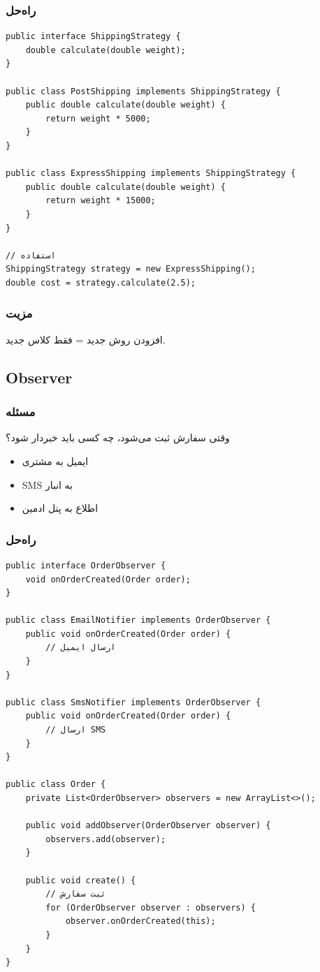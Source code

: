 \documentclass[12pt, a4paper]{article}
\begin{document}
\subsubsection{راه‌حل}
\begin{lstlisting}
public interface ShippingStrategy {
    double calculate(double weight);
}

public class PostShipping implements ShippingStrategy {
    public double calculate(double weight) {
        return weight * 5000;
    }
}

public class ExpressShipping implements ShippingStrategy {
    public double calculate(double weight) {
        return weight * 15000;
    }
}

// استفاده
ShippingStrategy strategy = new ExpressShipping();
double cost = strategy.calculate(2.5);
\end{lstlisting}

\subsubsection{مزیت}
افزودن روش جدید = فقط کلاس جدید.

\subsection{Observer}

\subsubsection{مسئله}
وقتی سفارش ثبت می‌شود، چه کسی باید خبردار شود؟
\begin{itemize}
    \item ایمیل به مشتری
    \item SMS به انبار
    \item اطلاع به پنل ادمین
\end{itemize}

\subsubsection{راه‌حل}
\begin{lstlisting}
public interface OrderObserver {
    void onOrderCreated(Order order);
}

public class EmailNotifier implements OrderObserver {
    public void onOrderCreated(Order order) {
        // ارسال ایمیل
    }
}

public class SmsNotifier implements OrderObserver {
    public void onOrderCreated(Order order) {
        // ارسال SMS
    }
}

public class Order {
    private List<OrderObserver> observers = new ArrayList<>();
    
    public void addObserver(OrderObserver observer) {
        observers.add(observer);
    }
    
    public void create() {
        // ثبت سفارش
        for (OrderObserver observer : observers) {
            observer.onOrderCreated(this);
        }
    }
}
\end{lstlisting}
\end{document}
